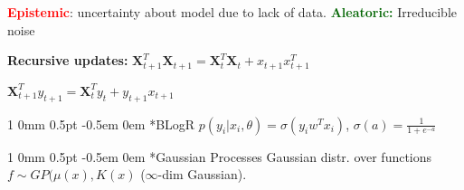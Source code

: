 \documentclass[11pt,landscape,a4paper,fleqn]{article}
\makeatletter
\newcommand*{\rsection}{%
	\@startsection{section}%
	{1}%
	{0mm}%
	{0.5pt}%
	{-0.5em \@plus 0em}
	{\color{myorange}\sffamily\small\bfseries}}
\newcommand{\mhl}[1]{\setlength{\fboxsep}{0pt}\colorbox{yellow}{#1}}
\makeatother
\begin{document}
\begin{multicols*}{4}
\textcolor{red}{\textbf{Epistemic}}: uncertainty about model due to lack of data. \textcolor{darkgreen}{\textbf{Aleatoric:}} Irreducible noise

\textbf{Recursive updates:} $\mathbf{X}_{t+1}^T \mathbf{X}_{t+1} = \mathbf{X}_{t}^T \mathbf{X}_{t} + x_{t+1} x_{t+1}^T$

$\mathbf{X}_{t+1}^T y_{t+1} = \mathbf{X}_{t}^T y_{t} + y_{t+1} x_{t+1}$

\rsection*{BLogR} $p(y_i | x_i, \theta) = \sigma(y_i w^T x_i)$, $\sigma(a) = \frac{1}{1 + e^{-a}}$

\iffalse
\rsection*{Kalman Filter} {\fontsize{9}{6}\selectfont $X_{t+1} \bot X_{1:t-1} | X_t$, $Y_t \bot Y_{1:t-1}, X_{1:t-1} | X_t$}

State $X_t$, Observation $Y_t$, Prior $P(X_1)  \sim \mathcal{N}(\mu, \Sigma)$

Motion model: $P(\mathbf{X}_{t+1} | \mathbf{X}_t) = \mathcal{N}(x_{t+1}; \mathbf{F} X_t, \Sigma_x)$, \mhl{$\mathbf{X}_{t+1} = \mathbf{F} \mathbf{X}_{t} + \epsilon_t$, $\epsilon_t \sim \mathcal{N}(0, \Sigma_x)$}

Sensor model: $P(\mathbf{Y}_t | \mathbf{X}_t) = \mathcal{N}(y_t; H X_t, \Sigma_y)$, \mhl{$\mathbf{Y}_t = \mathbf{H} \mathbf{X}_t + \eta_t$, $\eta_t \sim \mathcal{N}(0, \Sigma_y)$}

\textbf{Kalman update:} $\mu_{t+1} = \mathbf{F} \mu_t + \mathbf{K}_{t+1} (\mathbf{y}_{t+1} - \mathbf{H} \mathbf{F} \mu_t)$

$\Sigma_{t+1} = (\mathbf{I} - \mathbf{K}_{t+1} \mathbf{H}) (\mathbf{F} \Sigma_t \mathbf{F}^T + \Sigma_x)$

\textbf{Kalman gain:} \mhl{$\mathbf{K}_{t+1} = ( \mathbf{F} \Sigma_t \mathbf{F}^T + \Sigma_x ) \cdot $}\\
\mhl{$\cdot \mathbf{H}^T ( \mathbf{H} (\mathbf{F} \Sigma_t \mathbf{F}^T + \Sigma_x ) \mathbf{H}^T + \Sigma_y )^{-1}$}


\textbf{Bayesian Filtering in KFs} Keep track of state $X_t$ using rec. formula. Start $P(X_1) = \mathcal{N}(\mu, \Sigma)$.

At time $t$: assume we have $P(X_t | y_{1:t-1})$

Conditioning: \mhl{$P(X_t | y_{1:t}) = \frac{1}{Z} P(y_t | X_t) P(X_t | y_{1:t-1})$}

Prediction: \mhl{$P(X_{t+1} | y_{1:t}) = \int \hspace*{-1mm} P(X_{t+1} | x_t) P(x_t | y_{1:t}) dx_t$}
\fi

\vspace*{1mm}
\rsection*{Gaussian Processes} Gaussian distr. over
 functions $f \sim GP(\mu(x),K(x)$ ($\infty$-dim Gaussian). 


\end{multicols*}
\end{document}
